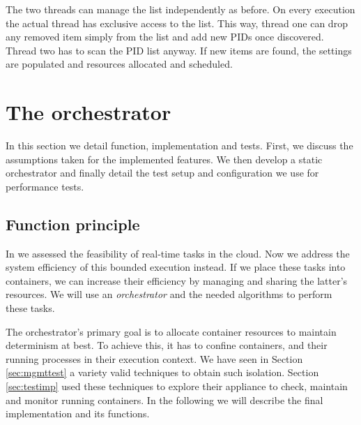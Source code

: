 \documentclass[]{scrartcl}
\begin{document}
The two threads can manage the list independently as before. On every execution the actual thread has exclusive access to the list.
This way, thread one can drop any removed item simply from the list and add new PIDs once discovered. 
Thread two has to scan the PID list anyway.
If new items are found, the settings are populated and resources allocated and scheduled.

\section{The orchestrator}
\label{sec:perftest}


In this section we detail function, implementation and tests.
First, we discuss the assumptions taken for the implemented features. We then develop a static orchestrator and finally detail the test setup and configuration we use for performance tests.

\subsection{Function principle}
\label{sub:funcdesc}

In \cite{Hoferetal2019} we assessed the feasibility of real-time tasks in the cloud. 
Now we address the system efficiency of this bounded execution instead.
If we place these tasks into containers, we can increase their efficiency by managing and sharing the latter's resources.
We will use an \emph{orchestrator} and the needed algorithms to perform these tasks.

The orchestrator's primary goal is to allocate container resources to maintain determinism at best.
To achieve this, it has to confine containers, and their running processes in their execution context.
We have seen in Section \ref{sec:mgmttest} a variety valid techniques to obtain such isolation.
Section \ref{sec:testimp} used these techniques to explore their appliance to check, maintain and monitor running containers.
In the following we will describe the final implementation and its functions.
\end{document}

